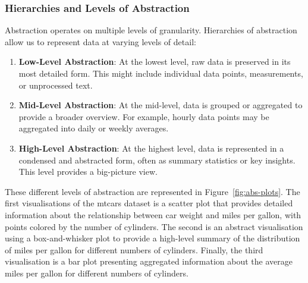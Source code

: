 \documentclass{article}\usepackage[]{graphicx}\usepackage[]{xcolor}
\numberwithin{equation}{section}
\begin{document}
\subsubsection{Hierarchies and Levels of Abstraction}
Abstraction operates on multiple levels of granularity. Hierarchies of abstraction allow us to represent data at varying levels of detail: 
\begin{enumerate}
    \item \textbf{Low-Level Abstraction}: At the lowest level, raw data is preserved in its most detailed form. This might include individual data points, measurements, or unprocessed text.
    \item \textbf{Mid-Level Abstraction}: At the mid-level, data is grouped or aggregated to provide a broader overview. For example, hourly data points may be aggregated into daily or weekly averages.
    \item \textbf{High-Level Abstraction}: At the highest level, data is represented in a condensed and abstracted form, often as summary statistics or key insights. This level provides a big-picture view.
\end{enumerate}

\noindent 
These different levels of abstraction are represented in Figure~\ref{fig:abs-plots}. The first visualisations of the mtcars dataset is a scatter plot that provides detailed information about the relationship between car weight and miles per gallon, with points colored by the number of cylinders. The second is an abstract visualisation using a box-and-whisker plot to provide a high-level summary of the distribution of miles per gallon for different numbers of cylinders. Finally, the third visualisation is a bar plot presenting aggregated information about the average miles per gallon for different numbers of cylinders.
\end{document}
